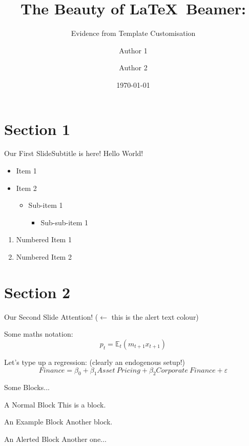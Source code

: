\documentclass[aspectratio=149, 10pt]{beamer}
\title[footer text]{The Beauty of \LaTeX \ Beamer:}
\subtitle{Evidence from Template Customisation}
\author{Author 1 \inst{$^\dagger$} \and Author 2 \inst{$^\ddagger$}}
\institute{\inst{$^\dagger$} Institution 1 \and \inst{$^\ddagger$} Institution 2}
\date{\today}
\begin{document}
{
\begin{frame}
  \titlepage
\end{frame}
}




\section{Section 1}

\begin{frame}{Our First Slide}{Subtitle is here!}
  Hello World!
  \vspace{\baselineskip}


  \begin{itemize}
    \item Item 1
    \item Item 2
          \begin{itemize}
            \item Sub-item 1
                  \begin{itemize}
                    \item Sub-sub-item 1
                  \end{itemize}
          \end{itemize}
  \end{itemize}

  \vspace{4ex}

  \begin{enumerate}
    \item Numbered Item 1
    \item Numbered Item 2
  \end{enumerate}
\end{frame}

\section{Section 2}

\begin{frame}{Our Second Slide}
  \alert{Attention! ($\leftarrow$ this is the alert text colour)}
  \vspace{4ex}

  Some maths notation:
  $$ p_t=\mathbb{E}_t(m_{t+1}x_{t+1}) $$

  \hrulefill

  Let's type up a regression: (clearly an endogenous setup!)
  $$ Finance = \beta_0 + \beta_1Asset\ Pricing + \beta_2Corporate\
    Finance + \varepsilon $$


\end{frame}

\begin{frame}{Some Blocks...}
  \begin{block}{A Normal Block}
    This is a block.
  \end{block}

  \begin{exampleblock}{An Example Block}
    Another block.
  \end{exampleblock}

  \begin{alertblock}{An Alerted Block}
    Another one...
  \end{alertblock}
\end{frame}
\end{document}
